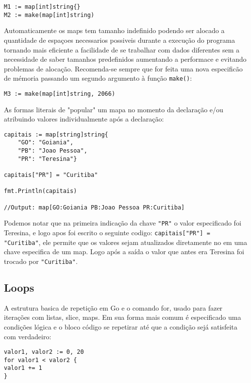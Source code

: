 \documentclass{SBCbookchapter}
\begin{document}
\begin{lstlisting}
M1 := map[int]string{}
M2 := make(map[int]string)
\end{lstlisting}

Automaticamente os maps tem tamanho indefinido podendo ser alocado a quantidade de espaçoes necessarios possiveis durante a execução do programa tornando mais eficiente a facilidade de se trabalhar com dados diferentes sem a necessidade de saber tamanhos predefinidos aumentando a performace e evitando problemas de alocação. Recomenda-se sempre que for feita uma nova especificão de mémoria passando um segundo argumento à função \texttt{make()}:   

\begin{lstlisting}
M3 := make(map[int]string, 2066)
\end{lstlisting}
As formas literais de "popular" um mapa no momento da declaração e/ou atribuindo valores individualmente após a declaração:


\begin{lstlisting}
capitais := map[string]string{
	"GO": "Goiania",
	"PB": "Joao Pessoa",
	"PR": "Teresina"}

capitais["PR"] = "Curitiba"

fmt.Println(capitais)

//Output: map[GO:Goiania PB:Joao Pessoa PR:Curitiba]

\end{lstlisting}

Podemos notar que na primeira indicação da chave \texttt{"PR"} o valor especificado foi Teresina, e logo apos foi escrito o seguinte codigo: \texttt{capitais["PR"] = "Curitiba"}, ele permite que os valores sejam atualizados diretamente no em uma chave especifica de um map. Logo após a saída o valor que antes era Teresina foi trocado por \texttt{"Curitiba"}.
\subsection{Loops}

A estrutura basica de repetição em Go e o comando for, usado para fazer iterações com listas, slice, maps. Em sua forma mais comum é especificado uma condições lógica e o bloco código se repetirar até que a condição sejá satisfeita com verdadeiro:


\begin{lstlisting}
valor1, valor2 := 0, 20
for valor1 < valor2 {
valor1 += 1
}
\end{lstlisting}
\end{document}
